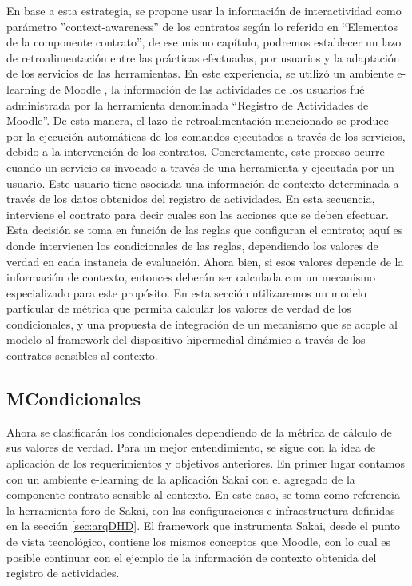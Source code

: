 En base a esta estrategia, se propone usar la información de interactividad como parámetro ''context-awareness'' de los contratos según lo referido en “Elementos de la componente contrato”, de ese mismo capítulo, podremos establecer un lazo de retroalimentación entre las prácticas efectuadas, por usuarios y la adaptación de los servicios de las herramientas. En este experiencia, se utilizó un ambiente e-learning de Moodle \cite{Moodle}, la información de las actividades de los usuarios fué administrada por la herramienta denominada ``Registro de Actividades de Moodle''. De esta manera, el lazo de retroalimentación mencionado se produce por la ejecución automáticas de los comandos ejecutados a través de los servicios, debido a la intervención de los contratos. Concretamente, este proceso ocurre cuando un servicio es invocado a través de una herramienta y ejecutada por un usuario. Este usuario tiene asociada una información de contexto determinada a través de los datos obtenidos del registro de actividades. En esta secuencia, interviene el contrato para decir cuales son las acciones que se deben efectuar. Esta decisión se toma en función de las reglas que configuran el contrato; aquí es donde intervienen los condicionales de las reglas, dependiendo los valores de verdad en cada instancia de evaluación. Ahora bien, si esos valores depende de la información de contexto, entonces deberán ser calculada con un mecanismo especializado para este propósito. En esta sección utilizaremos un modelo particular de métrica que permita calcular los valores de verdad de los condicionales, y una propuesta de integración de un mecanismo que se acople al modelo al framework del dispositivo hipermedial dinámico a través de los contratos sensibles al contexto.


\subsection{MCondicionales}


Ahora se clasificarán los condicionales dependiendo de la métrica de cálculo de sus valores de verdad. Para un mejor entendimiento, se sigue con la idea de aplicación de los requerimientos y objetivos anteriores. En primer lugar contamos con un ambiente e-learning de la aplicación Sakai con el agregado de la componente contrato sensible al contexto. En este caso, se toma como referencia la herramienta foro de Sakai, con las configuraciones e infraestructura definidas en la sección \ref{sec:arqDHD}. El framework que instrumenta Sakai, desde el punto de vista tecnológico, contiene los mismos conceptos que Moodle, con lo cual es posible continuar con el ejemplo de la información de contexto obtenida del registro de actividades. 


